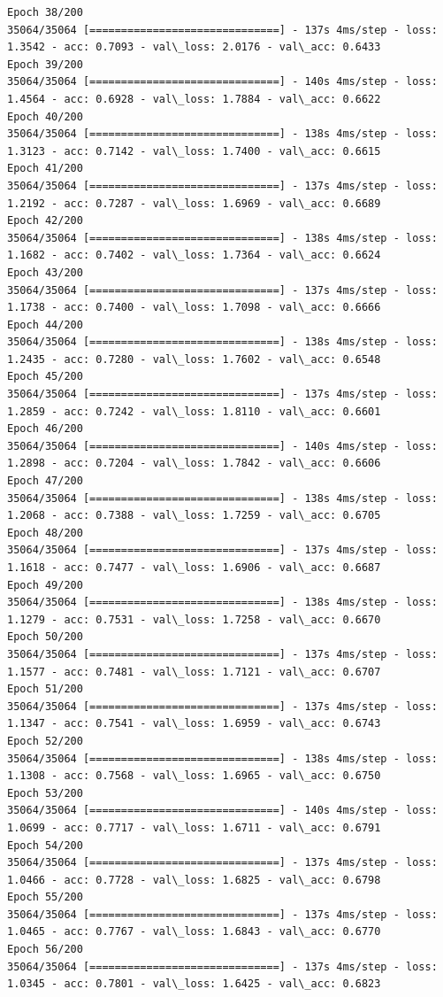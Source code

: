 \documentclass[11pt]{article}
\begin{document}
\begin{Verbatim}[commandchars=\\\{\}]
Epoch 38/200
35064/35064 [==============================] - 137s 4ms/step - loss: 1.3542 - acc: 0.7093 - val\_loss: 2.0176 - val\_acc: 0.6433
Epoch 39/200
35064/35064 [==============================] - 140s 4ms/step - loss: 1.4564 - acc: 0.6928 - val\_loss: 1.7884 - val\_acc: 0.6622
Epoch 40/200
35064/35064 [==============================] - 138s 4ms/step - loss: 1.3123 - acc: 0.7142 - val\_loss: 1.7400 - val\_acc: 0.6615
Epoch 41/200
35064/35064 [==============================] - 137s 4ms/step - loss: 1.2192 - acc: 0.7287 - val\_loss: 1.6969 - val\_acc: 0.6689
Epoch 42/200
35064/35064 [==============================] - 138s 4ms/step - loss: 1.1682 - acc: 0.7402 - val\_loss: 1.7364 - val\_acc: 0.6624
Epoch 43/200
35064/35064 [==============================] - 137s 4ms/step - loss: 1.1738 - acc: 0.7400 - val\_loss: 1.7098 - val\_acc: 0.6666
Epoch 44/200
35064/35064 [==============================] - 138s 4ms/step - loss: 1.2435 - acc: 0.7280 - val\_loss: 1.7602 - val\_acc: 0.6548
Epoch 45/200
35064/35064 [==============================] - 137s 4ms/step - loss: 1.2859 - acc: 0.7242 - val\_loss: 1.8110 - val\_acc: 0.6601
Epoch 46/200
35064/35064 [==============================] - 140s 4ms/step - loss: 1.2898 - acc: 0.7204 - val\_loss: 1.7842 - val\_acc: 0.6606
Epoch 47/200
35064/35064 [==============================] - 138s 4ms/step - loss: 1.2068 - acc: 0.7388 - val\_loss: 1.7259 - val\_acc: 0.6705
Epoch 48/200
35064/35064 [==============================] - 137s 4ms/step - loss: 1.1618 - acc: 0.7477 - val\_loss: 1.6906 - val\_acc: 0.6687
Epoch 49/200
35064/35064 [==============================] - 138s 4ms/step - loss: 1.1279 - acc: 0.7531 - val\_loss: 1.7258 - val\_acc: 0.6670
Epoch 50/200
35064/35064 [==============================] - 137s 4ms/step - loss: 1.1577 - acc: 0.7481 - val\_loss: 1.7121 - val\_acc: 0.6707
Epoch 51/200
35064/35064 [==============================] - 137s 4ms/step - loss: 1.1347 - acc: 0.7541 - val\_loss: 1.6959 - val\_acc: 0.6743
Epoch 52/200
35064/35064 [==============================] - 138s 4ms/step - loss: 1.1308 - acc: 0.7568 - val\_loss: 1.6965 - val\_acc: 0.6750
Epoch 53/200
35064/35064 [==============================] - 140s 4ms/step - loss: 1.0699 - acc: 0.7717 - val\_loss: 1.6711 - val\_acc: 0.6791
Epoch 54/200
35064/35064 [==============================] - 137s 4ms/step - loss: 1.0466 - acc: 0.7728 - val\_loss: 1.6825 - val\_acc: 0.6798
Epoch 55/200
35064/35064 [==============================] - 137s 4ms/step - loss: 1.0465 - acc: 0.7767 - val\_loss: 1.6843 - val\_acc: 0.6770
Epoch 56/200
35064/35064 [==============================] - 137s 4ms/step - loss: 1.0345 - acc: 0.7801 - val\_loss: 1.6425 - val\_acc: 0.6823

\end{Verbatim}
\end{document}
